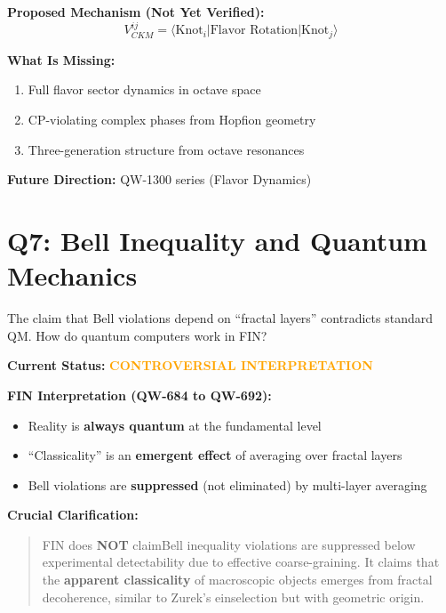 \documentclass[11pt,a4paper]{book}
\theoremstyle{remark}
\begin{document}
\textbf{Proposed Mechanism (Not Yet Verified):}
\begin{equation}
V_{CKM}^{ij} = \langle \text{Knot}_i | \text{Flavor Rotation} | \text{Knot}_j \rangle
\end{equation}

\textbf{What Is Missing:}
\begin{enumerate}
    \item Full flavor sector dynamics in octave space
    \item CP-violating complex phases from Hopfion geometry
    \item Three-generation structure from octave resonances
\end{enumerate}

\textbf{Future Direction:} QW-1300 series (Flavor Dynamics)

\hrulefill

\section{Q7: Bell Inequality and Quantum Mechanics}

\begin{question}
The claim that Bell violations depend on ``fractal layers'' contradicts standard QM. How do quantum computers work in FIN?
\end{question}

\textbf{Current Status:} \textcolor{orange}{\textbf{CONTROVERSIAL INTERPRETATION}}

\textbf{FIN Interpretation (QW-684 to QW-692):}
\begin{itemize}
    \item Reality is \textbf{always quantum} at the fundamental level
    \item ``Classicality'' is an \textbf{emergent effect} of averaging over fractal layers
    \item Bell violations are \textbf{suppressed} (not eliminated) by multi-layer averaging
\end{itemize}

\textbf{Crucial Clarification:}
\begin{quote}
FIN does \textbf{NOT} claimBell inequality violations are suppressed below experimental detectability due to effective coarse-graining. It claims that the \textbf{apparent classicality} of macroscopic objects emerges from fractal decoherence, similar to Zurek's einselection but with geometric origin.
\end{quote}
\end{document}

